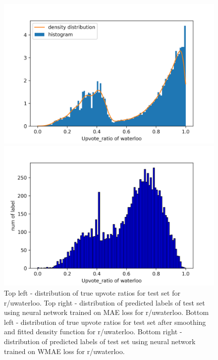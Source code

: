 \documentclass[11pt,a4paper]{article}
\begin{document}
\begin{figure}
        \begin{minipage}{0.5\textwidth}
            \includegraphics[width=\textwidth]{uwaterloo_task2true_smooth.png}
        \end{minipage}
        \begin{minipage}{0.5\textwidth}
            \includegraphics[width=\textwidth]{uwaterloo_task2pred_smooth.png}
        \end{minipage}

        \caption{
            Top left - distribution of true upvote ratios for test set for r/uwaterloo.
            Top right - distribution of predicted labels of test set using neural network trained on MAE loss for r/uwaterloo.
            Bottom left - distribution of true upvote ratios for test set after smoothing and fitted density function for r/uwaterloo.
            Bottom right - distribution of predicted labels of test set using neural network trained on WMAE loss for r/uwaterloo.
        }
    \end{figure}
\end{document}
